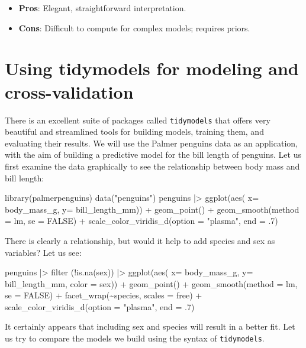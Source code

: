 \documentclass[
  letterpaper,
  DIV=11,
  numbers=noendperiod]{scrreprt}
\newenvironment{Shaded}{\begin{snugshade}}{\end{snugshade}}
\newcommand{\NormalTok}[1]{\textcolor[rgb]{0.00,0.23,0.31}{#1}}
\providecommand{\tightlist}{%
  \setlength{\itemsep}{0pt}\setlength{\parskip}{0pt}}\usepackage{longtable,booktabs,array}
\begin{document}
\begin{itemize}
\tightlist
\item
  \textbf{Pros}: Elegant, straightforward interpretation.
\item
  \textbf{Cons}: Difficult to compute for complex models; requires
  priors.
\end{itemize}

\section{Using tidymodels for modeling and
cross-validation}\label{using-tidymodels-for-modeling-and-cross-validation}

There is an excellent suite of packages called \texttt{tidymodels} that
offers very beautiful and streamlined tools for building models,
training them, and evaluating their results. We will use the Palmer
penguins data as an application, with the aim of building a predictive
model for the bill length of penguins. Let us first examine the data
graphically to see the relationship between body mass and bill length:

\begin{Shaded}
\begin{Highlighting}[]
\NormalTok{library(palmerpenguins)}
\NormalTok{data("penguins")}
\NormalTok{penguins |\textgreater{} ggplot(aes( x= body\_mass\_g, y= bill\_length\_mm)) +}
\NormalTok{  geom\_point() +}
\NormalTok{  geom\_smooth(method = lm, se = FALSE) +}
\NormalTok{  scale\_color\_viridis\_d(option = "plasma", end = .7)}
\end{Highlighting}
\end{Shaded}

There is clearly a relationship, but would it help to add species and
sex as variables? Let us see:

\begin{Shaded}
\begin{Highlighting}[]
\NormalTok{penguins |\textgreater{} filter (!is.na(sex)) |\textgreater{} ggplot(aes( x= body\_mass\_g, y= bill\_length\_mm, color = sex)) +}
\NormalTok{  geom\_point() +}
\NormalTok{  geom\_smooth(method = lm, se = FALSE) +}
\NormalTok{  facet\_wrap(\textasciitilde{}species, scales = \textquotesingle{}free\textquotesingle{}) +}
\NormalTok{  scale\_color\_viridis\_d(option = "plasma", end = .7)}
\end{Highlighting}
\end{Shaded}

It certainly appears that including sex and species will result in a
better fit. Let us try to compare the models we build using the syntax
of \texttt{tidymodels}.
\end{document}
